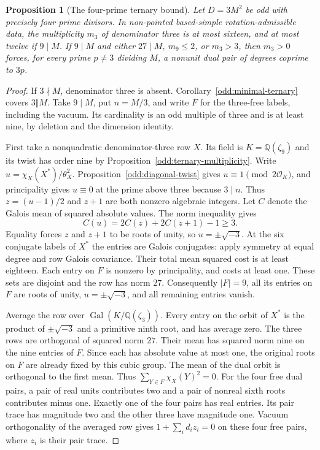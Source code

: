 \documentclass[11pt]{amsart}
\numberwithin{equation}{section}
\newtheorem{proposition}[theorem]{Proposition}
\theoremstyle{definition}
\theoremstyle{plain}
\begin{document}
\begin{proposition}[The four-prime ternary bound]\label{new:ternary-cap}
Let $D=3M^2$ be odd with precisely four prime divisors. In non-pointed
based-simple rotation-admissible data, the multiplicity $m_3$ of
denominator three is at most sixteen, and at most twelve if $9\mid M$. If $9\mid M$ and either
$27\mid M$, $m_9\le2$, or $m_3>3$, then $m_3>0$ forces, for every
prime $p\ne3$ dividing $M$, a nonunit dual pair of degrees
coprime to $3p$.
\end{proposition}
\begin{proof}
If $3\nmid M$, denominator three is absent. Corollary~\ref{odd:minimal-ternary} covers $3\Vert M$. Take
$9\mid M$, put $n=M/3$, and write $F$ for the three-free labels,
including the vacuum. Its cardinality is an odd multiple of three
and is at least nine, by deletion and the dimension identity.

First take a nonquadratic denominator-three row $X$. Its field is
$K=\mathbb Q(\zeta_9)$ and its twist has order nine by
Proposition~\ref{odd:ternary-multiplicity}. Write
$u=\chi_X(X^*)/\theta_X^2$. Proposition~\ref{odd:diagonal-twist} gives
$u\equiv1\pmod{2\mathcal O_K}$, and principality gives $u\equiv0$
at the prime above three because $3\mid n$. Thus
$z=(u-1)/2$ and $z+1$ are both nonzero algebraic integers.
Let $C$ denote the Galois mean of squared absolute values.
The norm inequality gives
\[
 C(u)=2C(z)+2C(z+1)-1\ge3.
\]
Equality forces $z$ and $z+1$ to be roots of unity, so
$u=\pm\sqrt{-3}$. At the six conjugate labels of $X^*$ the entries
are Galois conjugates: apply symmetry at equal degree and row
Galois covariance. Their total mean squared cost is at least eighteen.
Each entry on $F$ is nonzero by principality, and costs at least one.
These sets are disjoint and the row has norm $27$. Consequently
$|F|=9$, all its entries on $F$ are roots of unity, $u=\pm\sqrt{-3}$,
and all remaining entries vanish.

Average the row over $\operatorname{Gal}(K/\mathbb Q(\zeta_3))$.
Every entry on the orbit of $X^*$ is the product of $\pm\sqrt{-3}$
and a primitive ninth root, and has average zero. The three rows are
orthogonal of squared norm $27$. Their mean has squared norm nine on
the nine entries of $F$. Since each has absolute value at most one,
the original roots on $F$ are already fixed by this cubic group.
The mean of the dual orbit is orthogonal to the first mean. Thus
$\sum_{Y\in F}\chi_X(Y)^2=0$. For the four free dual pairs, a pair
of real units contributes two and a pair of nonreal sixth roots
contributes minus one. Exactly one of the four pairs has real entries.
Its pair trace has magnitude two and the other three have magnitude
one. Vacuum orthogonality of the averaged row gives
$1+\sum_i d_i z_i=0$ on these four free pairs, where $z_i$ is their
pair trace.


\end{proof}
\end{document}
